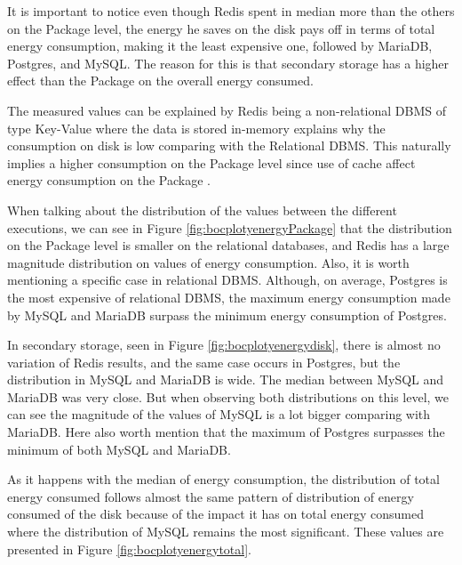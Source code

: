     It is important to notice even though Redis spent in median more than the others on the Package level, the energy he saves on the disk pays off in terms of total energy consumption, making it the least expensive one, followed by MariaDB, Postgres, and MySQL. The reason for this is that secondary storage has a higher effect than the Package on the overall energy consumed.


    The measured values can be explained by Redis being a non-relational DBMS of type Key-Value where the data is stored in-memory explains why the consumption on disk is low comparing with the Relational DBMS. This naturally implies a higher consumption on the Package level since use of cache affect energy consumption on the Package \cite{10.55552505464}.
    

\newpage


	
	When talking about the distribution of the values between the different executions, we can see in Figure \ref{fig:bocplotyenergyPackage} that the distribution on the Package level is smaller on the relational databases, and Redis has a large magnitude distribution on values of energy consumption.
    Also, it is worth mentioning a specific case in relational DBMS. Although, on average, Postgres is the most expensive of relational DBMS, the maximum energy consumption made by MySQL and MariaDB surpass the minimum energy consumption of Postgres.
	
	In secondary storage, seen in Figure \ref{fig:bocplotyenergydisk}, there is almost no variation of  Redis results, and the same case occurs in Postgres, but the distribution in MySQL and MariaDB is wide. The median between MySQL and MariaDB was very close. But when observing both distributions on this level, we can see the magnitude of the values of MySQL is a lot bigger comparing with MariaDB. Here also worth mention that the maximum of Postgres surpasses the minimum of both MySQL and MariaDB.


    As it happens with the median of energy consumption, the distribution of total energy consumed follows almost the same pattern of distribution of energy consumed of the disk because of the impact it has on total energy consumed where the distribution of MySQL remains the most significant. These values are presented in Figure  \ref{fig:bocplotyenergytotal}.
    

